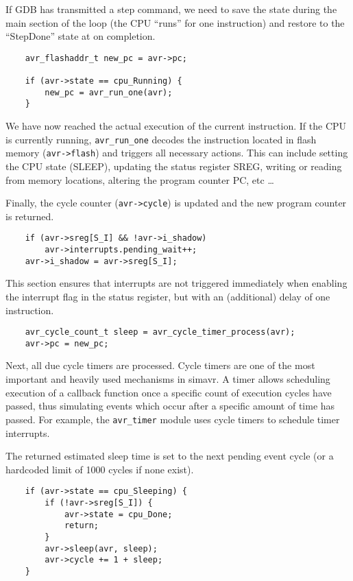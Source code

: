 If GDB has transmitted a step command, we need to save the state during the
main section of the loop (the CPU ``runs'' for one instruction) and restore to
the ``StepDone'' state at on completion.

\begin{lstlisting}
    avr_flashaddr_t new_pc = avr->pc;

    if (avr->state == cpu_Running) {
        new_pc = avr_run_one(avr);
    }
\end{lstlisting}

We have now reached the actual execution of the current instruction. If the CPU
is currently running, \lstinline|avr_run_one| decodes the instruction located in flash memory
(\lstinline|avr->flash|) and triggers all necessary actions. This can include setting the CPU
state (SLEEP), updating the status register SREG, writing or reading from memory
locations, altering the program counter PC, etc \ldots

Finally, the cycle counter (\lstinline|avr->cycle|) is updated and the new
program counter is returned.

\begin{lstlisting}
    if (avr->sreg[S_I] && !avr->i_shadow)
        avr->interrupts.pending_wait++;
    avr->i_shadow = avr->sreg[S_I];
\end{lstlisting}

This section ensures that interrupts are not triggered immediately when
enabling the interrupt flag in the status register, but with an (additional)
delay of one instruction.

\begin{lstlisting}
    avr_cycle_count_t sleep = avr_cycle_timer_process(avr);
    avr->pc = new_pc;
\end{lstlisting}

Next, all due cycle timers are processed. Cycle timers are one of the
most important and heavily used mechanisms in simavr. A timer allows scheduling
execution of a callback function once a specific count of execution cycles have
passed, thus simulating events which occur after a specific amount of time has
passed. For example, the \lstinline|avr_timer| module uses cycle timers to schedule timer
interrupts.

The returned estimated sleep time is set to the next pending event cycle (or a
hardcoded limit of 1000 cycles if none exist).

\begin{lstlisting}
    if (avr->state == cpu_Sleeping) {
        if (!avr->sreg[S_I]) {
            avr->state = cpu_Done;
            return;
        }
        avr->sleep(avr, sleep);
        avr->cycle += 1 + sleep;
    }
\end{lstlisting}

